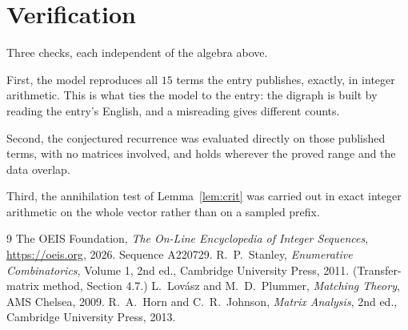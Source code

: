 \documentclass[11pt,a4paper]{article}
\theoremstyle{plain}
\theoremstyle{definition}
\begin{document}
\section{Verification}

Three checks, each independent of the algebra above.

First, the model reproduces all $15$ terms the entry publishes, exactly, in integer
arithmetic. This is what ties the model to the entry: the digraph is built by reading the
entry's English, and a misreading gives different counts.

Second, the conjectured recurrence was evaluated directly on those published terms, with no
matrices involved, and holds wherever the proved range and the data overlap.

Third, the annihilation test of Lemma~\ref{lem:crit} was carried out in exact integer
arithmetic on the whole vector rather than on a sampled prefix.

\begin{thebibliography}{9}
 The OEIS Foundation, \emph{The On-Line Encyclopedia of Integer
Sequences}, \url{https://oeis.org}, 2026. Sequence A220729.
 R.~P.~Stanley, \emph{Enumerative Combinatorics}, Volume 1, 2nd ed.,
Cambridge University Press, 2011. (Transfer-matrix method, Section 4.7.)
 L.~Lov\'asz and M.~D.~Plummer, \emph{Matching Theory}, AMS Chelsea,
2009.
 R.~A.~Horn and C.~R.~Johnson, \emph{Matrix Analysis}, 2nd ed., Cambridge
University Press, 2013.
\end{thebibliography}
\end{document}
